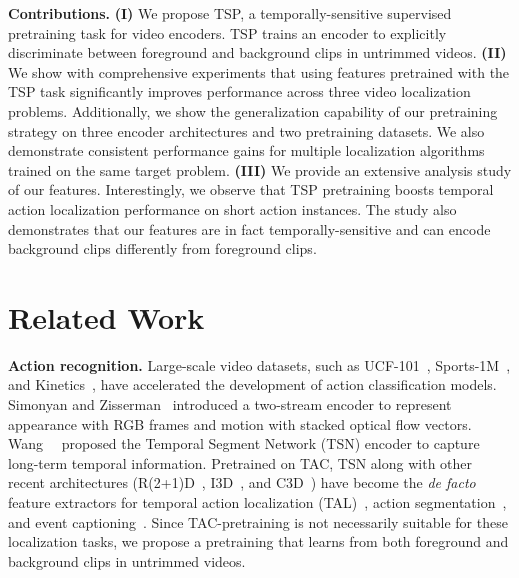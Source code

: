 \documentclass[10pt,twocolumn,letterpaper]{article}
\begin{document}
\vspace{3pt}\noindent\textbf{Contributions.}
\textbf{(I)} We propose TSP, a temporally-sensitive supervised pretraining task for video encoders. TSP trains an encoder to explicitly discriminate between foreground and background clips in untrimmed videos.
\textbf{(II)} We show with comprehensive experiments that using features pretrained with the TSP task significantly improves performance across three video localization problems. Additionally, we show the generalization capability of our pretraining strategy on three encoder architectures and two pretraining datasets. We also demonstrate consistent performance gains for multiple localization algorithms trained on the same target problem. 
\textbf{(III)} We provide an extensive analysis study of our features. Interestingly, we observe that TSP pretraining boosts temporal action localization performance on short action instances. The study also demonstrates that our features are in fact temporally-sensitive and can encode background clips differently from foreground clips. 





 \section{Related Work}\label{sec:related_work}
\vspace{-2pt}

\noindent\textbf{Action recognition.}
Large-scale video datasets, such as UCF-101~\cite{dataset_ucf101}, Sports-1M~\cite{dataset_sports1m}, and Kinetics~\cite{dataset_kinetics}, have accelerated the development of action classification models. Simonyan and Zisserman~\cite{two_stream} introduced a two-stream encoder to represent appearance with RGB frames and motion with stacked optical flow vectors. Wang~\etal~\cite{tsn} proposed the Temporal Segment Network (TSN) encoder to capture long-term temporal information. Pretrained on TAC, TSN along with other recent architectures (\eg R(2+1)D~\cite{tran2018closer}, I3D~\cite{i3d}, and C3D~\cite{c3d}) have become the \emph{de facto} feature extractors for temporal action localization (TAL)~\cite{piergiovanni_cvpr_2018}, action segmentation~\cite{action_segmentation}, and event captioning~\cite{event_captioning}. Since TAC-pretraining is not necessarily suitable for these localization tasks, we propose a pretraining that learns from both foreground and background clips in untrimmed videos.
\end{document}
